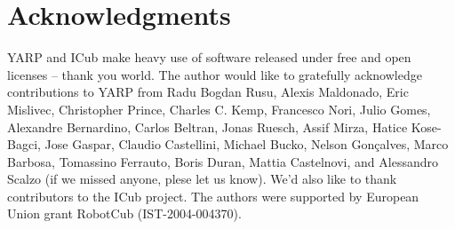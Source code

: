 
\section{Acknowledgments}

YARP and ICub make heavy use of software released under free and open
licenses -- thank you world.
%
The author would like to gratefully acknowledge contributions to YARP
from Radu Bogdan Rusu, Alexis Maldonado, Eric Mislivec, Christopher
Prince, Charles C. Kemp, Francesco Nori, Julio Gomes, Alexandre
Bernardino, Carlos Beltran, Jonas Ruesch, Assif Mirza, Hatice
Kose-Bagci, Jose Gaspar, Claudio Castellini, Michael Bucko, Nelson
Gon\c calves, Marco Barbosa, Tomassino Ferrauto, Boris Duran, Mattia
Castelnovi, and Alessandro Scalzo (if we missed anyone, plese let us
know).  We'd also like to thank contributors to the ICub project.
%
The authors were supported by European Union
grant RobotCub (IST-2004-004370).




